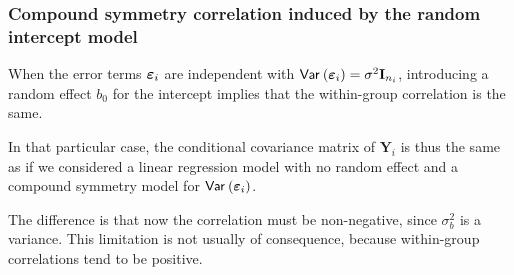 \documentclass{beamer}
\begin{document}
\begin{frame}[fragile]
\frametitle{Compound symmetry correlation induced by the random intercept model}

\bi \item 
When the error terms $\boldsymbol {\varepsilon}_i$ are independent with ${\mathsf{Var}_{}}\left(\boldsymbol {\varepsilon}_i\right)=\sigma^2\mathbf{I}_{n_i}$, introducing a random effect $b_0$ for the intercept implies that the within-group correlation is the same.
\item 
In that particular case, the conditional covariance matrix of $\boldsymbol{Y}_i$ is thus the same as if we considered a linear regression model with no random effect and a compound symmetry model for ${\mathsf{Var}_{}}\left(\boldsymbol {\varepsilon}_i\right)$.
\item 
The difference is that now the correlation must be non-negative, since $\sigma^2_b$ is a variance. This limitation is not usually of consequence, because within-group correlations tend to be positive.
\ei
\end{frame}
% 
\end{document}
